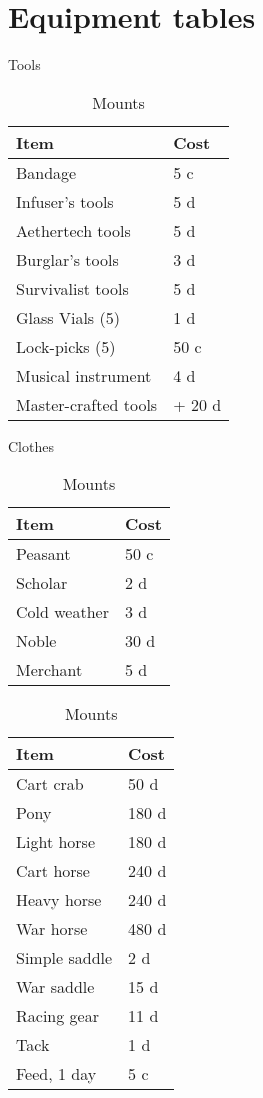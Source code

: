 \documentclass[a4paper,11pt,oneside]{book}
\begin{document}
\chapter{Equipment tables}
\begin{table}[ht]
	\parbox{0.45\hsize}{
	\centering
	\caption{Tools}
	\label{tab:tools}
	\begin{tabular}{|l|l|}
		\hline
		Item & Cost\\ [0.5ex]
		\hline
		Bandage & 5 c\\
		Infuser's tools & 5 d\\
		Aethertech tools & 5 d \\
		Burglar's tools & 3 d \\
		Survivalist tools & 5 d \\
		Glass Vials (5)& 1 d\\
		Lock-picks (5) & 50 c\\
		Musical instrument & 4 d\\		
		\hline
		Master-crafted tools & + 20 d\\
		\hline
	\end{tabular}}
	\parbox{0.45\hsize}{
	\centering
	\caption{Clothes}
	\begin{tabular}{|l|l|}
		\hline
		Item & Cost\\ [0.5ex]
		\hline
		Peasant & 50 c\\
		Scholar & 2 d\\
		Cold weather & 3 d\\
		Noble & 30 d\\
		Merchant & 5 d\\
		\hline
	\end{tabular}}

	\centering
	\caption{Mounts}
	\begin{tabular}{|l|l|}
		\hline
		Item & Cost\\ [0.5ex]
		\hline
		Cart crab & 50 d \\ 
		Pony & 180 d\\
		Light horse & 180 d\\
		Cart horse & 240 d\\
		Heavy horse & 240 d\\
		War horse & 480 d\\
		\hline
		Simple saddle & 2 d\\
		War saddle & 15 d\\
		Racing gear & 11 d\\
		Tack & 1 d\\
		Feed, 1 day & 5 c\\
		\hline
	\end{tabular}
\end{table}
\end{document}

